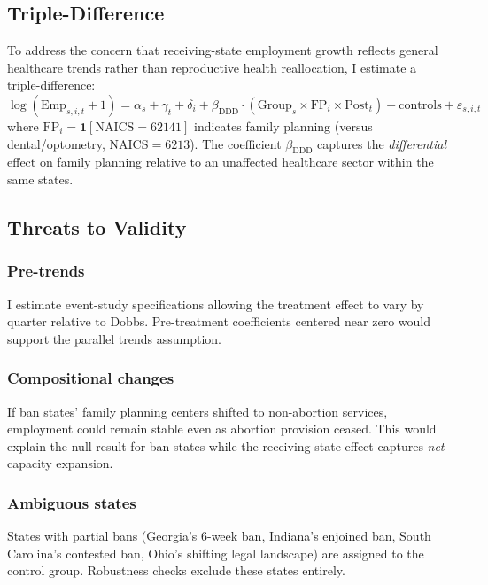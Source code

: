 \documentclass[12pt]{article}
\begin{document}
\subsection{Triple-Difference}

To address the concern that receiving-state employment growth reflects general healthcare trends rather than reproductive health reallocation, I estimate a triple-difference:
\begin{equation}
\log(\text{Emp}_{s,i,t} + 1) = \alpha_s + \gamma_t + \delta_i + \beta_{\text{DDD}} \cdot (\text{Group}_s \times \text{FP}_i \times \text{Post}_t) + \text{controls} + \varepsilon_{s,i,t}
\label{eq:ddd}
\end{equation}
where $\text{FP}_i = \mathbf{1}[\text{NAICS} = 62141]$ indicates family planning (versus dental/optometry, $\text{NAICS} = 6213$). The coefficient $\beta_{\text{DDD}}$ captures the \textit{differential} effect on family planning relative to an unaffected healthcare sector within the same states.

\subsection{Threats to Validity}

\subsubsection*{Pre-trends}
I estimate event-study specifications allowing the treatment effect to vary by quarter relative to Dobbs. Pre-treatment coefficients centered near zero would support the parallel trends assumption.

\subsubsection*{Compositional changes}
If ban states' family planning centers shifted to non-abortion services, employment could remain stable even as abortion provision ceased. This would explain the null result for ban states while the receiving-state effect captures \textit{net} capacity expansion.

\subsubsection*{Ambiguous states}
States with partial bans (Georgia's 6-week ban, Indiana's enjoined ban, South Carolina's contested ban, Ohio's shifting legal landscape) are assigned to the control group. Robustness checks exclude these states entirely.
\end{document}
